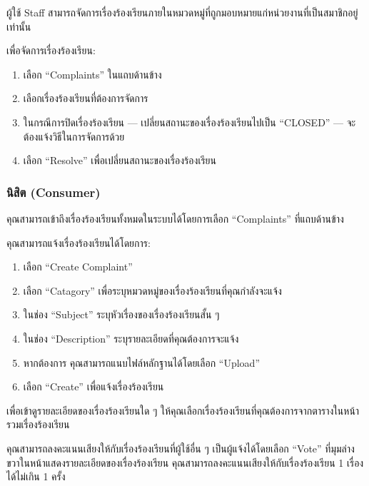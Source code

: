 ผู้ใช้ Staff สามารถจัดการเรื่องร้องเรียนภายในหมวดหมู่ที่ถูกมอบหมายแก่หน่วยงานที่เป็นสมาชิกอยู่เท่านั้น

เพื่อจัดการเรื่องร้องเรียน:

\begin{enumerate}
    \item เลือก  ``Complaints'' ในแถบด้านข้าง
    \item เลือกเรื่องร้องเรียนที่ต้องการจัดการ
    \item ในกรณีการปิดเรื่องร้องเรียน --- เปลี่ยนสถานะของเรื่องร้องเรียนไปเป็น ``CLOSED'' --- จะต้องแจ้งวิธีในการจัดการด้วย
    \item เลือก ``Resolve'' เพื่อเปลี่ยนสถานะของเรื่องร้องเรียน
\end{enumerate}

\pagebreak[4]

\subsubsection{นิสิต (Consumer)}\label{subsubsec:role-usage-consumer}


คุณสามารถเข้าถึงเรื่องร้องเรียนทั้งหมดในระบบได้โดยการเลือก ``Complaints'' ที่แถบด้านข้าง

\pagebreak[3]


คุณสามารถแจ้งเรื่องร้องเรียนได้โดยการ:

\begin{enumerate}
    \item เลือก ``Create Complaint''
    \item เลือก ``Catagory'' เพื่อระบุหมวดหมู่ของเรื่องร้องเรียนที่คุณกำลังจะแจ้ง
    \item ในช่อง ``Subject'' ระบุหัวเรื่องของเรื่องร้องเรียนสั้น ๆ
    \item ในช่อง ``Description'' ระบุรายละเอียดที่คุณต้องการจะแจ้ง
    \item หากต้องการ คุณสามารถแนบไฟล์หลักฐานได้โดยเลือก ``Upload''
    \item เลือก ``Create'' เพื่อแจ้งเรื่องร้องเรียน
\end{enumerate}

\pagebreak[3]


เพื่อเข้าดูรายละเอียดของเรื่องร้องเรียนใด ๆ ให้คุณเลือกเรื่องร้องเรียนที่คุณต้องการจากตารางในหน้ารวมเรื่องร้องเรียน

\pagebreak[3]


คุณสามารถลงคะแนนเสียงให้กับเรื่องร้องเรียนที่ผู้ใช้อื่น ๆ เป็นผู้แจ้งได้โดยเลือก ``Vote''
ที่มุมล่างขวาในหน้าแสดงรายละเอียดของเรื่องร้องเรียน
คุณสามารถลงคะแนนเสียงให้กับเรื่องร้องเรียน 1 เรื่องได้ไม่เกิน 1 ครั้ง

\pagebreak[4]

